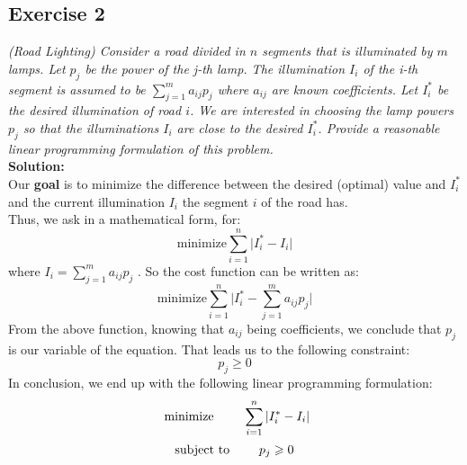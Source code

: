 \documentclass[12pt]{article}
\begin{document}

\subsection*{Exercise 2}
\textit{(Road Lighting) Consider a road divided in $n$ segments that is illuminated by $m$ lamps. Let $p_j$ be the power of the j-th lamp. The illumination $I_i$ of the i-th segment is assumed to be $\sum_{j=1}^m{a_{ij}p_{j}}$ where $a_{ij}$ are known coefficients. Let $I_i^{*}$ be the desired illumination of road $i$. We are interested in choosing the lamp powers $p_j$ so that the illuminations $I_i$ are close to the desired $I_i^{*}$. Provide a reasonable linear programming formulation of this problem.} \\
\textbf{Solution:} \\
Our \textbf{goal} is to minimize the difference between the desired (optimal) value and $I_i^{*}$ and the current illumination $I_i$ the segment $i$ of the road has. \\
Thus, we ask in a mathematical form, for: 
$$\text{minimize} \sum_{i=1}^n{\vert I_i^{*} - I_i \vert}$$
where $I_i = \sum_{j=1}^m{a_{ij}p_{j}}$ . So the cost function can be written as: 
$$\text{minimize} \sum_{i=1}^n{\vert I_i^{*} - \sum_{j=1}^m{a_{ij}p_{j}} \vert}$$
From the above function, knowing that $a_{ij}$ being coefficients, we conclude that $p_j$ is our variable of the equation. That leads us to the following constraint: $$p_j \geqslant 0 $$
In conclusion, we end up with the following linear programming formulation: 
$$ \text{  minimize \quad} \quad \sum_{i=1}^n{\vert I_i^{*} - I_i \vert}$$
$$ \text{subject to \quad} \quad  p_j \geqslant 0 $$
\newpage

\end{document}
